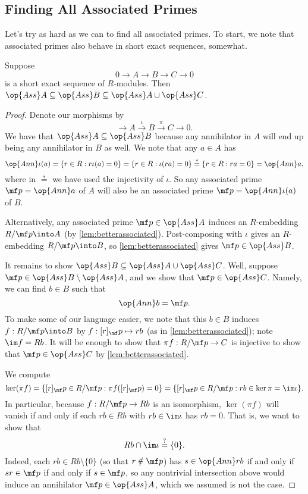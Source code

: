 \subsection{Finding All Associated Primes}
Let's try as hard as we can to find all associated primes. To start, we note that associated primes also behave in short exact sequences, somewhat.
\begin{lemma} \label{lem:assses}
	Suppose
	\[0\to A\to B\to C\to 0\]
	is a short exact sequence of $R$-modules. Then $\op{Ass}A\subseteq\op{Ass}B\subseteq\op{Ass}A\cup\op{Ass}C$.
\end{lemma}
\begin{proof}
	Denote our morphisms by
	\[\to A\stackrel\iota\to B\stackrel\pi\to C\to 0.\]
	We have that $\op{Ass}A\subseteq\op{Ass}B$ because any annihilator in $A$ will end up being any annihilator in $B$ as well. We note that any $a\in A$ has
	\[\op{Ann}\iota(a)=\{r\in R:r\iota(a)=0\}=\{r\in R:\iota(ra)=0\}\stackrel*=\{r\in R:ra=0\}=\op{Ann}a,\]
	where in $\stackrel*=$ we have used the injectivity of $\iota$. So any associated prime $\mf p=\op{Ann}a$ of $A$ will also be an associated prime $\mf p=\op{Ann}\iota(a)$ of $B$.
	\begin{remark}[Nir]
		Alternatively, any associated prime $\mf p\in\op{Ass}A$ induces an $R$-embedding $R/\mf p\into A$ (by \autoref{lem:betterassociated}). Post-composing with $\iota$ gives an $R$-embedding $R/\mf p\into B$, so \autoref{lem:betterassociated} gives $\mf p\in\op{Ass}B$.
	\end{remark}

	It remains to show $\op{Ass}B\subseteq\op{Ass}A\cup\op{Ass}C$. Well, suppose $\mf p\in\op{Ass}B\setminus\op{Ass}A$, and we show that $\mf p\in\op{Ass}C$. Namely, we can find $b\in B$ such that
	\[\op{Ann}b=\mf p.\]
	To make some of our language easier, we note that this $b\in B$ induces $f:R/\mf p\into B$ by $f:[r]_\mf p\mapsto rb$ (as in \autoref{lem:betterassociated}); note $\im f=Rb$. It will be enough to show that $\pi f:R/\mf p\to C$ is injective to show that $\mf p\in\op{Ass}C$ by \autoref{lem:betterassociated}.
	
	We compute
	\[\ker(\pi f)=\{[r]_\mf p\in R/\mf p:\pi f([r]_\mf p)=0\}=\{[r]_\mf p\in R/\mf p:rb\in\ker\pi=\im\iota\}.\]
	In particular, because $f:R/\mf p\to Rb$ is an isomorphism, $\ker(\pi f)$ will vanish if and only if each $rb\in Rb$ with $rb\in\im\iota$ has $rb=0$. That is, we want to show that
	\[Rb\cap\im\iota\stackrel?=\{0\}.\]
	Indeed, each $rb\in Rb\setminus\{0\}$ (so that $r\notin\mf p$) has $s\in\op{Ann}rb$ if and only if $sr\in\mf p$ if and only if $s\in\mf p$, so any nontrivial intersection above would induce an annihilator $\mf p\in\op{Ass}A$, which we assumed is not the case.
\end{proof}
